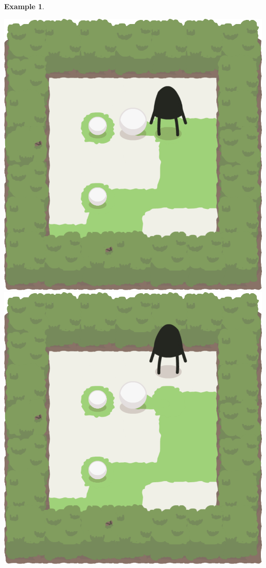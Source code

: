 \documentclass{report}
\theoremstyle{plain}
\newtheorem{example}{Example}[section]
\begin{document}
\begin{example}
\begin{center}
\includegraphics[width=\andyWidth\textwidth]{andy-basic-5.png} \quad
\includegraphics[width=\andyWidth\textwidth]{andy-basic-6.png} \quad

\end{center}
\end{example}
\end{document}
